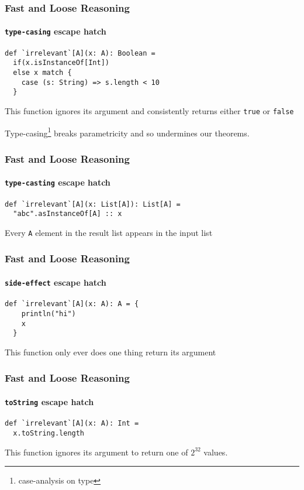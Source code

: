 \begin{frame}[fragile]
\frametitle{Fast and Loose Reasoning}
\framesubtitle{\lstinline{type-casing} escape hatch}
\begin{lstlisting}[style=scala]
def `irrelevant`[A](x: A): Boolean = 
  if(x.isInstanceOf[Int])
  else x match {
    case (s: String) => s.length < 10
  }
\end{lstlisting}
\begin{theorem}This function ignores its argument and consistently returns either \lstinline{true} or \lstinline{false}\end{theorem}
Type-casing\footnote{case-analysis on type} breaks parametricity and so undermines our theorems.
\end{frame}

\begin{frame}[fragile]
\frametitle{Fast and Loose Reasoning}
\framesubtitle{\lstinline{type-casting} escape hatch}
\begin{lstlisting}[style=scala]
def `irrelevant`[A](x: List[A]): List[A] = 
  "abc".asInstanceOf[A] :: x  
\end{lstlisting}
\begin{theorem}Every \lstinline{A} element in the result list appears in the input list\end{theorem}
\end{frame}

\begin{frame}[fragile]
\frametitle{Fast and Loose Reasoning}
\framesubtitle{\lstinline{side-effect} escape hatch}
\begin{lstlisting}[style=scala]
def `irrelevant`[A](x: A): A = {
    println("hi")
    x
  }
\end{lstlisting}
\begin{theorem}This function only ever does one thing \textemdash return its argument \end{theorem}
\end{frame}

\begin{frame}[fragile]
\frametitle{Fast and Loose Reasoning}
\framesubtitle{\lstinline{toString} escape hatch}
\begin{lstlisting}[style=scala]
def `irrelevant`[A](x: A): Int =
  x.toString.length
\end{lstlisting}
\begin{theorem}This function ignores its argument to return one of {${2^{32}}$} values. \end{theorem}
\end{frame}

